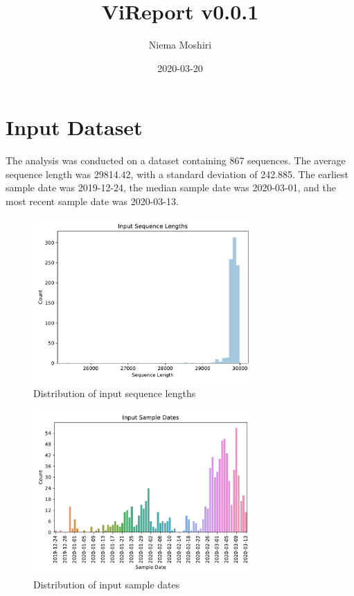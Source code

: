 \documentclass{article}
\title{\vspace{-2.0cm}ViReport v0.0.1}
\author{Niema Moshiri}
\date{2020-03-20}
\begin{document}
\maketitle

\section{Input Dataset}
The analysis was conducted on a dataset containing 867 sequences. The average sequence length was 29814.42, with a standard deviation of 242.885. The earliest sample date was 2019-12-24, the median sample date was 2020-03-01, and the most recent sample date was 2020-03-13.

\begin{figure}[h]
\centering
\includegraphics[width=0.75\textwidth,keepaspectratio]{./figs/input_sequence_lengths.pdf}
\caption{Distribution of input sequence lengths}
\end{figure}



\begin{figure}[h]
\centering
\includegraphics[width=0.75\textwidth,keepaspectratio]{./figs/input_sample_dates.pdf}
\caption{Distribution of input sample dates}
\end{figure}
\end{document}
